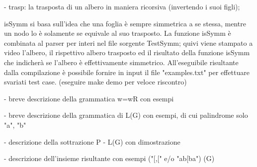 \documentclass[a4paper, oneside, 11pt]{article}
\begin{document}
- trasp: la trasposta di un albero in maniera ricorsiva (invertendo i suoi figli);

isSymm si basa sull'idea che una foglia \`e sempre simmetrica a se stessa, mentre un nodo lo \`e solamente se equivale al suo trasposto.
   La funzione isSymm \`e combinata al parser per interi nel file sorgente TestSymm; quivi viene stampato a video l'albero, il rispettivo albero trasposto ed il risultato della funzione isSymm che indicherà se l'albero \`e effettivamente simmetrico.
  All'eseguibile risultante dalla compilazione \`e possibile fornire in input il file "examples.txt" per effettuare svariati test case.
  (eseguire make demo per veloce riscontro)

  - breve descrizione della grammatica w=wR con esempi

- breve descrizione della grammatica di L(G) con esempi, di cui palindrome solo "a", "b"

- descrizione della sottrazione P - L(G) con dimostrazione

- descrizione dell'insieme risultante con esempi ("[,[" e/o "ab[ba")
  (G)
\end{document}
